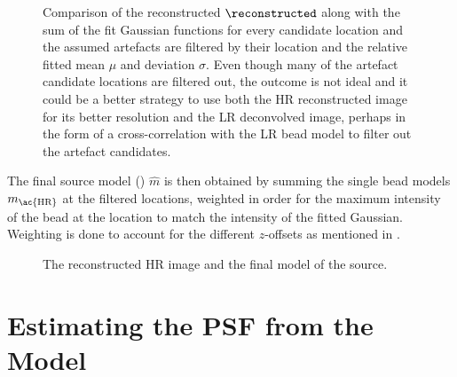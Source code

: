 
\begin{figure}[h]
    \caption{%
        Comparison of the reconstructed \(\reconstructed\) along with the sum of the fit Gaussian functions for every
            candidate location and the assumed artefacts are filtered by their location and the relative fitted mean
            \(\mu\) and deviation \(\sigma\).
        Even though many of the artefact candidate locations are filtered out, the outcome is not ideal and it could be
            a better strategy to use both the \ac{HR} reconstructed image for its better resolution and the \ac{LR}
            deconvolved image, perhaps in the form of a cross-correlation with the \ac{LR} bead model to filter out the
            artefact candidates.
    }
\end{figure}

The final source model () \(\hat{m}\) is then obtained by summing the single bead models 
    \(m_\text{\ac{HR}}\) at the filtered locations, weighted in order for the maximum intensity of the bead at the 
    location to match the intensity of the fitted Gaussian.
Weighting is done to account for the different \(z\)-offsets as mentioned in .


\begin{figure}[h]
    \caption{The reconstructed \ac{HR} image and the final model of the source.}
\end{figure}

\section{Estimating the PSF from the Model}%

